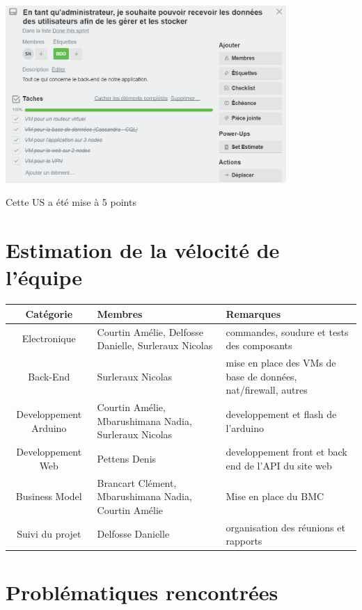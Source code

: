 \begin{center}
    \includegraphics[width=0.8\textwidth]{images/US03.png}~\\[0.5cm]
     \end{center}
\begin{flushright}
 Cette US a été mise à 5 points \\ 
\end{flushright}

\section{Estimation de la vélocité de l'équipe}
\begin{tabularx}{15cm}{|c|p{4.5cm}|X|}
    \hline
    \textbf{Catégorie} & \textbf{Membres} & \textbf{Remarques} \\
    \hline
    Electronique & Courtin Amélie, Delfosse Danielle, Surleraux Nicolas & commandes, soudure et tests des composants \\
    \hline
    Back-End & Surleraux Nicolas & mise en place des VMs de base de données, nat/firewall, autres\\
    \hline
    Developpement Arduino & Courtin Amélie, Mbarushimana Nadia, Surleraux Nicolas & developpement et flash de l'arduino \\ 
    \hline
    Developpement Web & Pettens Denis & developpement front et back end de l'API du site web \\
    \hline
    Business Model & Brancart Clément, Mbarushimana Nadia, Courtin Amélie & Mise en place du BMC \\
    \hline
    Suivi du projet & Delfosse Danielle & organisation des réunions et rapports \\ 
    \hline
\end{tabularx}
\section{Problématiques rencontrées}

